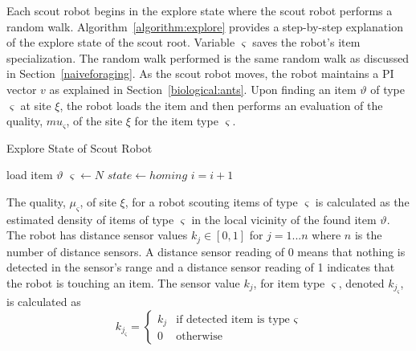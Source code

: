 Each scout robot begins in the explore state where the scout robot performs a random walk. Algorithm~\ref{algorithm:explore} provides a step-by-step explanation of the explore state of the scout root. Variable $\varsigma$ saves the robot's item specialization. The random walk performed is the same random walk as discussed in Section~\ref{naiveforaging}. As the scout robot moves, the robot maintains a PI vector $v$ as explained in Section~\ref{biological:ants}. Upon finding an item $\vartheta$ of type $\varsigma$ at site $\xi$, the robot loads the item and then performs an evaluation of the quality, $mu_\varsigma$, of the site $\xi$ for the item type $\varsigma$. 


\begin{algorithm}
\caption{Explore State of Scout Robot}
\label{algorithm:explore}
\begin{algorithmic}[1]
\State {}
\State {}

 	\State {}
	\State load item $\vartheta$
	\State $\varsigma \gets N$
	\State $state \gets homing$
\EndIf
\State $i =i + 1$
\EndFunction
\end{algorithmic}
\end{algorithm}

The quality, $\mu_\varsigma$, of site $\xi$, for a robot scouting items of type $\varsigma$ is calculated as the estimated density of items of type $\varsigma$ in the local vicinity of the found item $\vartheta$. The robot has distance sensor values $k_j\in[0,1]$ for $j = 1...n$ where $n$ is the number of distance sensors. A distance sensor reading of 0 means that nothing is detected in the sensor's range and a distance sensor reading of 1 indicates that the robot is touching an item. The sensor value $k_j$, for item type $\varsigma$, denoted $k_{j_\varsigma}$, is calculated as 
\begin{equation}
\label{densitytype}
k_{j_\varsigma}=
    \begin{cases}
      k_j & \text{if detected item is type $\varsigma$} \\
      0 & \text{otherwise}
    \end{cases}
\end{equation}

